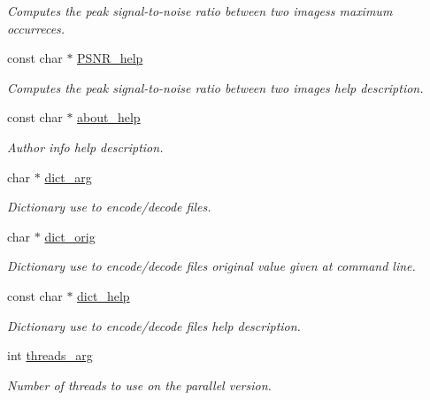 \begin{DoxyCompactItemize}
\begin{DoxyCompactList}\small\item\em Computes the peak signal-\/to-\/noise ratio between two images\textquotesingle{}s maximum occurreces. \end{DoxyCompactList}\item 
const char $\ast$ \hyperlink{structgengetopt__args__info_a8cc1db291d64a0a1885e4064e74b547f}{P\+S\+N\+R\+\_\+help}
\begin{DoxyCompactList}\small\item\em Computes the peak signal-\/to-\/noise ratio between two images help description. \end{DoxyCompactList}\item 
const char $\ast$ \hyperlink{structgengetopt__args__info_aa34aa7a314743acdbe4c5fdbc95239b3}{about\+\_\+help}
\begin{DoxyCompactList}\small\item\em Author info help description. \end{DoxyCompactList}\item 
char $\ast$ \hyperlink{structgengetopt__args__info_aac983ce261d786f26f087a839c2ef9a0}{dict\+\_\+arg}
\begin{DoxyCompactList}\small\item\em Dictionary use to encode/decode files. \end{DoxyCompactList}\item 
char $\ast$ \hyperlink{structgengetopt__args__info_acca4a4510495e721e10c44306b85381a}{dict\+\_\+orig}
\begin{DoxyCompactList}\small\item\em Dictionary use to encode/decode files original value given at command line. \end{DoxyCompactList}\item 
const char $\ast$ \hyperlink{structgengetopt__args__info_aadf00f1fa374c83519aa8948d73d24a2}{dict\+\_\+help}
\begin{DoxyCompactList}\small\item\em Dictionary use to encode/decode files help description. \end{DoxyCompactList}\item 
int \hyperlink{structgengetopt__args__info_a691cdcfa9efb6faa4f508d2884baccd4}{threads\+\_\+arg}
\begin{DoxyCompactList}\small\item\em Number of threads to use on the parallel version. \end{DoxyCompactList}\item 

\end{DoxyCompactItemize}
